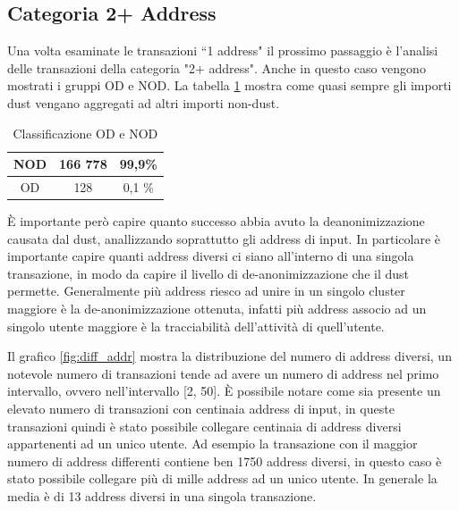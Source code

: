 \subsection{Categoria 2+ Address}
Una volta esaminate le transazioni ``1 address" il prossimo passaggio è l'analisi delle transazioni della categoria "2+ address". Anche in questo caso vengono mostrati i gruppi OD e NOD. La tabella \ref{tab:OD_NOD_success} mostra come quasi sempre gli importi dust vengano aggregati ad altri importi non-dust.
\begin{table}[H]
    \centering
    \begin{tabular}{|c|c|c|}
        \hline
            NOD  & 166 778 & 99,9\%\\
        \hline 
            OD  & 128 & 0,1 \%\\
        \hline
    \end{tabular}
    \caption{Classificazione OD e NOD}
    \label{tab:OD_NOD_success}
\end{table}
È importante però capire quanto successo abbia avuto la deanonimizzazione causata dal dust, anallizzando soprattutto gli address di input. In particolare è importante capire quanti address diversi ci siano all'interno di una singola transazione, in modo da capire il livello di de-anonimizzazione che il dust permette. Generalmente più address riesco ad unire in un singolo cluster maggiore è la de-anonimizzazione ottenuta, infatti più address associo ad un singolo utente maggiore è la tracciabilità dell'attività di quell'utente.

Il grafico \ref{fig:diff_addr} mostra la distribuzione del numero di address diversi, un notevole numero di transazioni tende ad avere un numero di address nel primo intervallo, ovvero nell'intervallo [2, 50]. È possibile notare come sia presente un elevato numero di transazioni con centinaia address di input, in queste transazioni quindi è stato possibile collegare centinaia di address diversi appartenenti ad un unico utente. Ad esempio la transazione con il maggior numero di address differenti contiene ben 1750 address diversi, in questo caso è stato possibile collegare più di mille address ad un unico utente. In generale la media è di 13 address diversi in una singola transazione. 

